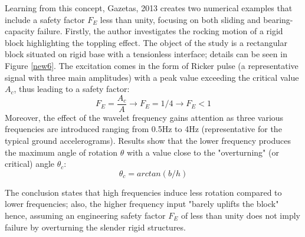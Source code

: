 \documentclass[12pt,a4paper]{report}
\begin{document}
 Learning from this concept, Gazetas, 2013 \cite{gazetas2013can} creates two numerical examples that include a safety factor $F_E$ less than unity, focusing on both sliding and bearing-capacity failure.
Firstly, the author investigates the rocking motion of a rigid block highlighting the toppling effect. The object of the study is a rectangular block situated on rigid base with a tensionless interface; details can be seen in Figure \ref{new6}. The excitation comes in the form of Ricker pulse (a representative signal with three main amplitudes) with a peak value exceeding the critical value $A_c$, thus leading to a safety factor:
 \begin{equation}
 F_E= \frac{A_c}{A} \longrightarrow F_E=1/4 \longrightarrow F_E<1
 \end{equation}
 Moreover, the effect of the wavelet frequency gains attention as three various frequencies are introduced ranging from 0.5Hz to 4Hz (representative for the typical ground accelerograms). Results show that the lower frequency produces the maximum angle of rotation $\theta$ with a value close to the "overturning" (or critical) angle $\theta_c$:
 \begin{equation}
 	\theta_c=arctan(b/h)
 \end{equation}
 
 The conclusion states that high frequencies induce less rotation compared to lower frequencies; also, the higher frequency input "barely uplifts the block" hence, assuming an engineering safety factor $F_E$ of less than unity does not imply failure by overturning the slender rigid structures.
  
\end{document}
